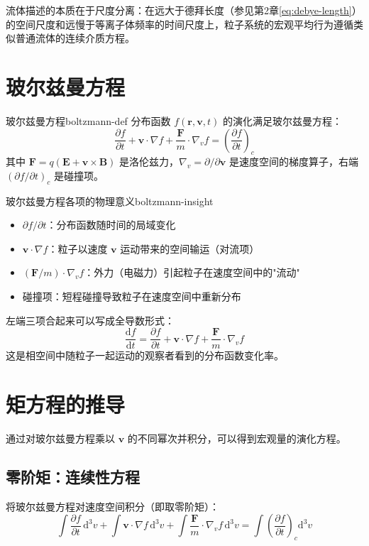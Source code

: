 \documentclass[12pt,a4paper,openany,oneside]{book}
\newcommand{\diff}{\mathrm{d}}
\newcommand{\vect}[1]{\bm{#1}}
\newcommand{\grad}{\nabla}
\newcommand{\difficulty}[1]{\marginnote{\hfill\textcolor{coverMid!80}{\rule[-0.1em]{2pt}{0.9em}}\,\textcolor{coverMid}{\footnotesize\textbf{[#1]}}}}
\begin{document}
流体描述的本质在于尺度分离：在远大于德拜长度（参见第2章\cref{eq:debye-length}）的空间尺度和远慢于等离子体频率的时间尺度上，粒子系统的宏观平均行为遵循类似普通流体的连续介质方程。

\section{玻尔兹曼方程}\difficulty{基础}

\begin{definition}{玻尔兹曼方程}{boltzmann-def}
分布函数 $f(\vect{r},\vect{v},t)$ 的演化满足玻尔兹曼方程：
\[
\frac{\partial f}{\partial t} + \vect{v}\cdot\grad f + \frac{\vect{F}}{m}\cdot\grad_v f = \left(\frac{\partial f}{\partial t}\right)_c
\]
其中 $\vect{F} = q(\vect{E} + \vect{v}\times\vect{B})$ 是洛伦兹力，$\grad_v = \partial/\partial\vect{v}$ 是速度空间的梯度算子，右端 $(\partial f/\partial t)_c$ 是碰撞项。
\end{definition}

\begin{insight}{玻尔兹曼方程各项的物理意义}{boltzmann-insight}
\begin{itemize}
\item $\partial f/\partial t$：分布函数随时间的局域变化
\item $\vect{v}\cdot\grad f$：粒子以速度 $\vect{v}$ 运动带来的空间输运（对流项）
\item $(\vect{F}/m)\cdot\grad_v f$：外力（电磁力）引起粒子在速度空间中的"流动"
\item 碰撞项：短程碰撞导致粒子在速度空间中重新分布
\end{itemize}
左端三项合起来可以写成全导数形式：
\[
\frac{\diff f}{\diff t} = \frac{\partial f}{\partial t} + \vect{v}\cdot\grad f + \frac{\vect{F}}{m}\cdot\grad_v f
\]
这是相空间中随粒子一起运动的观察者看到的分布函数变化率。
\end{insight}

\section{矩方程的推导}\difficulty{提高}

通过对玻尔兹曼方程乘以 $\vect{v}$ 的不同幂次并积分，可以得到宏观量的演化方程。

\subsection{零阶矩：连续性方程}

将玻尔兹曼方程对速度空间积分（即取零阶矩）：
\[
\int \frac{\partial f}{\partial t}\,\diff^3v + \int \vect{v}\cdot\grad f\,\diff^3v + \int \frac{\vect{F}}{m}\cdot\grad_v f\,\diff^3v = \int \left(\frac{\partial f}{\partial t}\right)_c \diff^3v
\]
\end{document}
